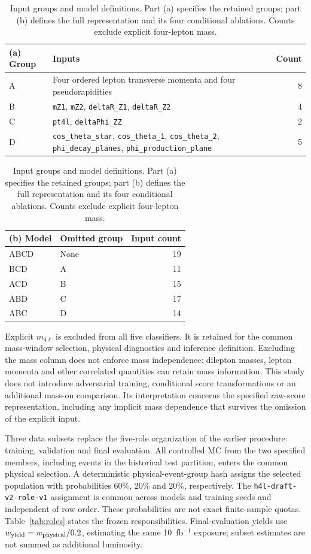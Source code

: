 \documentclass[aps,prd,reprint,superscriptaddress,nofootinbib,longbibliography,floatfix]{revtex4-2}
\let\label\OriginalLaTeXLabel
\begin{document}
\begin{table}[tbp]
\caption{Input groups and model definitions. Part (a) specifies the retained
groups; part (b) defines the full representation and its four conditional ablations. Counts
exclude explicit four-lepton mass.}
\label{tab:inputs}
\centering
\begin{tabular}{@{}p{}p{}r@{}}
\toprule
\textbf{(a) Group} & \textbf{Inputs} & \textbf{Count} \\
\midrule
A & Four ordered lepton transverse momenta and four pseudorapidities & 8 \\
B & \nolinkurl{mZ1}, \nolinkurl{mZ2}, \nolinkurl{deltaR_Z1}, \nolinkurl{deltaR_Z2} & 4 \\
C & \nolinkurl{pt4l}, \nolinkurl{deltaPhi_ZZ} & 2 \\
D & \nolinkurl{cos_theta_star}, \nolinkurl{cos_theta_1}, \nolinkurl{cos_theta_2}, \nolinkurl{phi_decay_planes}, \nolinkurl{phi_production_plane} & 5 \\
\bottomrule
\end{tabular}


\begin{tabular}{llr}
\toprule
\textbf{(b) Model} & \textbf{Omitted group} & \textbf{Input count} \\
\midrule
ABCD & None & 19 \\
BCD & A & 11 \\
ACD & B & 15 \\
ABD & C & 17 \\
ABC & D & 14 \\
\bottomrule
\end{tabular}
\end{table}

Explicit \(m_{4\ell}\) is excluded from all five classifiers. It is retained for the common
mass-window selection, physical diagnostics and inference definition. Excluding the mass
column does not enforce mass independence: dilepton masses, lepton momenta and other
correlated quantities can retain mass information. This study does not introduce
adversarial training, conditional score transformations or an additional mass-on comparison.
Its interpretation concerns the specified raw-score representation, including any implicit
mass dependence that survives the omission of the explicit input.

Three data subsets replace the five-role organization of the earlier procedure:
training, validation and final evaluation. All controlled MC from the two specified
members, including events in the historical test partition, enters the common
physical selection. A deterministic physical-event-group hash assigns the selected
population with probabilities 60\%, 20\% and 20\%, respectively. The
\nolinkurl{h4l-draft-v2-role-v1} assignment is common across models and training seeds
and independent of row order. These probabilities are not exact finite-sample
quotas. Table~\ref{tab:roles} states the frozen responsibilities. Final-evaluation yields use
\(w_{\rm yield}=w_{\rm physical}/0.2\), estimating the same 10~fb$^{-1}$ exposure;
subset estimates are not summed as additional luminosity.
\end{document}
